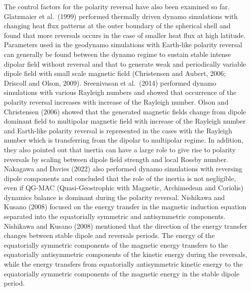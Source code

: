 The control factors for the polarity reversal have also been examined so far.
Glatzmaier et al.\ (1999) %
performed thermally driven dynamo simulations with changing heat flux patterns at the outer boundary of the spherical shell and found that more reversals occurs in the case of smaller heat flux at high latitude. %
{\color{red} %
Parameters used in the geodynamo simulations with Earth-like polarity reversal can generally be found between the dynamo regime to sustain stable intense dipolar field without reversal and that to generate weak and periodically variable dipole field with small scale magnetic field (Christensen and Aubert, 2006; 
Driscoll and Olson, 2009). %
}
Sreenivasan et al.\ (2014) %
performed dynamo simulations with various Rayleigh numbers and showed that occurrence of the polarity reversal increases with increase of the Rayleigh number. 
Olson and Christensen (2006) %
showed that the generated magnetic fields change from dipole dominant field to multipolar magnetic field with increase of the Rayleigh number and Earth-like polarity reversal is represented in the cases with the Rayleigh number which is transferring from the dipolar to multipolar regime. 
In addition, they also pointed out that inertia can have a large role to give rise to polarity reversals by scaling between dipole field strength and local Rossby number.
{\color{green}
Nakagawa and Davies (2022) 
also performed dynamo simulations with reversing dipole components and concluded that the role of the inertia is not negligible, even if QG-MAC (Quasi-Geostrophic with Magnetic, Archimedean and Coriolis) dynamics balance is dominant during the polarity reversal.
}
Nishikawa and Kusano (2008) 
focused on the energy transfer in the magnetic induction equation separated into the equatorially symmetric and antisymmetric components. 
Nishikawa and Kusano (2008) mentioned that the direction of the energy transfer changes between stable dipole and reversals periods. 
The energy of the equatorially symmetric components of the magnetic energy transfers to the equatorially antisymmetric components of the kinetic energy during the reversals, while the energy transfers from equatorially antisymmetric kinetic energy to the equatorially symmetric components of the magnetic energy in the stable dipole period.


